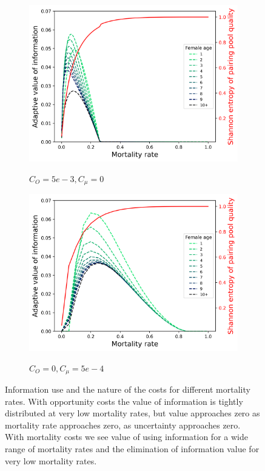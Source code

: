 \documentclass[10pt]{article} %
\begin{document}
\begin{figure}
	\centering
	\begin{subfigure}{.5\textwidth}
		\centering
		\caption{$C_O = 5e-3, C_\mu = 0$}
		\includegraphics[width=1.\linewidth]{../figures/mortCo.png}
		\label{fig:sub5}
	\end{subfigure}%
	\begin{subfigure}{.5\textwidth}
		\centering
		\caption{$C_O = 0, C_\mu = 5e-4$}
		\includegraphics[width=1.\linewidth]{../figures/Mortmu2.png}
		\label{fig:sub6}%
	\end{subfigure}%
\caption{Information use and the nature of the costs for different mortality rates. With opportunity costs the value of information is tightly distributed at very low mortality rates, but value approaches zero as mortality rate approaches zero, as uncertainty approaches zero. With mortality costs we see value of using information for a wide range of mortality rates and the elimination of information value for very low mortality rates. }
\label{fig:5}
\end{figure}
\end{document}
